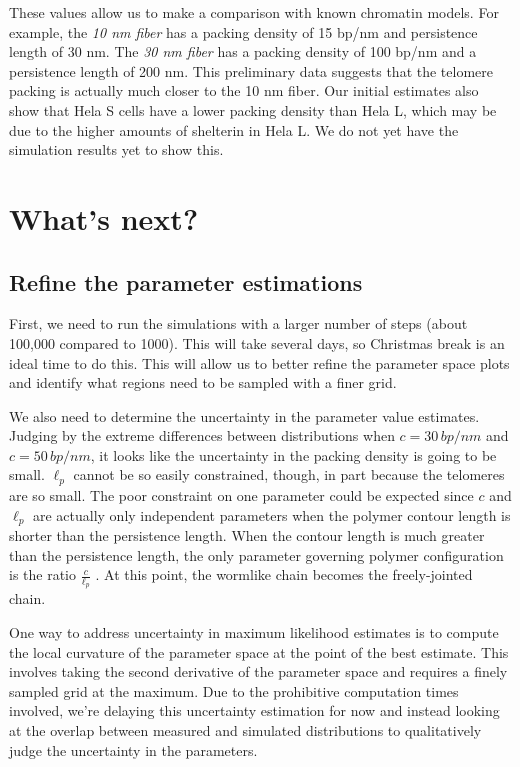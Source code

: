 \documentclass[11pt]{article}
\begin{document}
These values allow us to make a comparison with known chromatin
models. For example, the \emph{10 nm fiber} has a packing density of 15
bp/nm and persistence length of 30 nm. The \emph{30 nm fiber} has a packing
density of 100 bp/nm and a persistence length of 200 nm. This
preliminary data suggests that the telomere packing is actually much
closer to the 10 nm fiber. Our initial estimates also show that Hela S
cells have a lower packing density than Hela L, which may be due to
the higher amounts of shelterin in Hela L. We do not yet have the
simulation results yet to show this.

\section{What's next?}
\label{sec-4}

\subsection{Refine the parameter estimations}
\label{sec-4-1}
First, we need to run the simulations with a larger number of steps
(about 100,000 compared to 1000). This will take several days, so
Christmas break is an ideal time to do this. This will allow us to
better refine the parameter space plots and identify what regions need
to be sampled with a finer grid.

We also need to determine the uncertainty in the parameter value
estimates. Judging by the extreme differences between distributions
when $c=30 \, bp/nm$ and $c=50 \, bp/nm$, it looks like the
uncertainty in the packing density is going to be small. $\ell_p$
cannot be so easily constrained, though, in part because the telomeres
are so small. The poor constraint on one parameter could be expected
since $c$ and $\ell_p$ are actually only independent parameters when
the polymer contour length is shorter than the persistence
length. When the contour length is much greater than the persistence
length, the only parameter governing polymer configuration is the
ratio $\frac{c}{\ell_p}$ \cite{martin-thesis-2008}. At this point, the
wormlike chain becomes the freely-jointed chain.

One way to address uncertainty in maximum likelihood estimates is to
compute the local curvature of the parameter space at the point of the
best estimate. This involves taking the second derivative of the
parameter space and requires a finely sampled grid at the maximum. Due
to the prohibitive computation times involved, we're delaying this
uncertainty estimation for now and instead looking at the overlap
between measured and simulated distributions to qualitatively judge
the uncertainty in the parameters.
\end{document}
